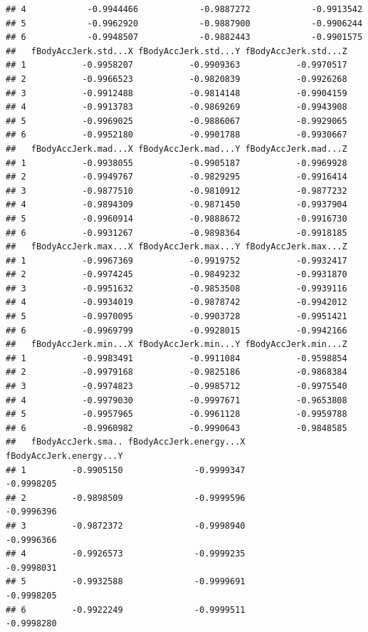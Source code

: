 \documentclass[
]{article}
\begin{document}
\begin{verbatim}
## 4            -0.9944466            -0.9887272            -0.9913542
## 5            -0.9962920            -0.9887900            -0.9906244
## 6            -0.9948507            -0.9882443            -0.9901575
##   fBodyAccJerk.std...X fBodyAccJerk.std...Y fBodyAccJerk.std...Z
## 1           -0.9958207           -0.9909363           -0.9970517
## 2           -0.9966523           -0.9820839           -0.9926268
## 3           -0.9912488           -0.9814148           -0.9904159
## 4           -0.9913783           -0.9869269           -0.9943908
## 5           -0.9969025           -0.9886067           -0.9929065
## 6           -0.9952180           -0.9901788           -0.9930667
##   fBodyAccJerk.mad...X fBodyAccJerk.mad...Y fBodyAccJerk.mad...Z
## 1           -0.9938055           -0.9905187           -0.9969928
## 2           -0.9949767           -0.9829295           -0.9916414
## 3           -0.9877510           -0.9810912           -0.9877232
## 4           -0.9894309           -0.9871450           -0.9937904
## 5           -0.9960914           -0.9888672           -0.9916730
## 6           -0.9931267           -0.9898364           -0.9918185
##   fBodyAccJerk.max...X fBodyAccJerk.max...Y fBodyAccJerk.max...Z
## 1           -0.9967369           -0.9919752           -0.9932417
## 2           -0.9974245           -0.9849232           -0.9931870
## 3           -0.9951632           -0.9853508           -0.9939116
## 4           -0.9934019           -0.9878742           -0.9942012
## 5           -0.9970095           -0.9903728           -0.9951421
## 6           -0.9969799           -0.9928015           -0.9942166
##   fBodyAccJerk.min...X fBodyAccJerk.min...Y fBodyAccJerk.min...Z
## 1           -0.9983491           -0.9911084           -0.9598854
## 2           -0.9979168           -0.9825186           -0.9868384
## 3           -0.9974823           -0.9985712           -0.9975540
## 4           -0.9979030           -0.9997671           -0.9653808
## 5           -0.9957965           -0.9961128           -0.9959788
## 6           -0.9960982           -0.9990643           -0.9848585
##   fBodyAccJerk.sma.. fBodyAccJerk.energy...X fBodyAccJerk.energy...Y
## 1         -0.9905150              -0.9999347              -0.9998205
## 2         -0.9898509              -0.9999596              -0.9996396
## 3         -0.9872372              -0.9998940              -0.9996366
## 4         -0.9926573              -0.9999235              -0.9998031
## 5         -0.9932588              -0.9999691              -0.9998205
## 6         -0.9922249              -0.9999511              -0.9998280

\end{verbatim}
\end{document}
